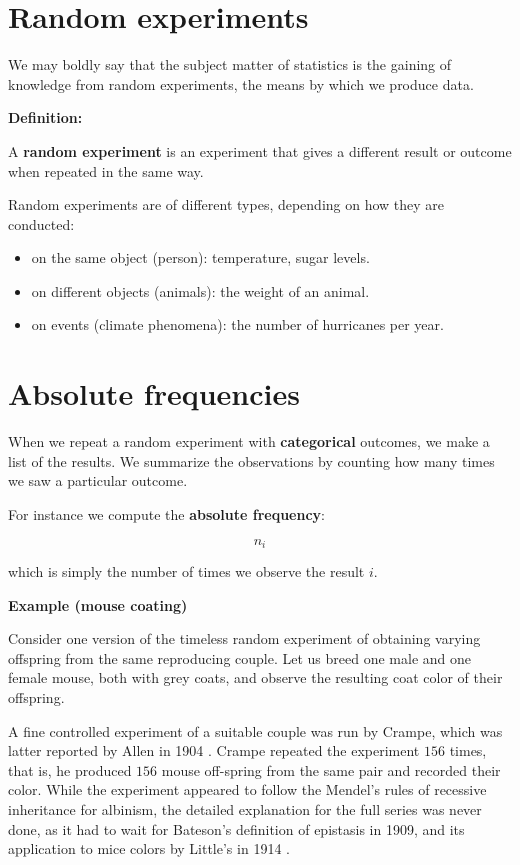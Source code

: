 \documentclass[
]{book}
\providecommand{\tightlist}{%
  \setlength{\itemsep}{0pt}\setlength{\parskip}{0pt}}
\begin{document}
\hypertarget{random-experiments}{%
\section{Random experiments}\label{random-experiments}}

We may boldly say that the subject matter of statistics is the gaining of knowledge from random experiments, the means by which we produce data.

\textbf{Definition:}

A \textbf{random experiment} is an experiment that gives a different result or outcome when repeated in the same way.

Random experiments are of different types, depending on how they are conducted:

\begin{itemize}
\tightlist
\item
  on the same object (person): temperature, sugar levels.
\item
  on different objects (animals): the weight of an animal.
\item
  on events (climate phenomena): the number of hurricanes per year.
\end{itemize}

\hypertarget{absolute-frequencies}{%
\section{Absolute frequencies}\label{absolute-frequencies}}

When we repeat a random experiment with \textbf{categorical} outcomes, we make a list of the results. We summarize the observations by counting how many times we saw a particular outcome.

For instance we compute the \textbf{absolute frequency}:

\[n_i\]

which is simply the number of times we observe the result \(i\).

\textbf{Example (mouse coating)}

Consider one version of the timeless random experiment of obtaining varying offspring from the same reproducing couple. Let us breed one male and one female mouse, both with grey coats, and observe the resulting coat color of their offspring.

A fine controlled experiment of a suitable couple was run by Crampe, which was latter reported by Allen in 1904 \citep{allen1904heredity}. Crampe repeated the experiment \(156\) times, that is, he produced \(156\) mouse off-spring from the same pair and recorded their color. While the experiment appeared to follow the Mendel's rules of recessive inheritance for albinism, the detailed explanation for the full series was never done, as it had to wait for Bateson's definition of epistasis in 1909, and its application to mice colors by Little's in 1914 \citep{little1914possible}.
\end{document}
